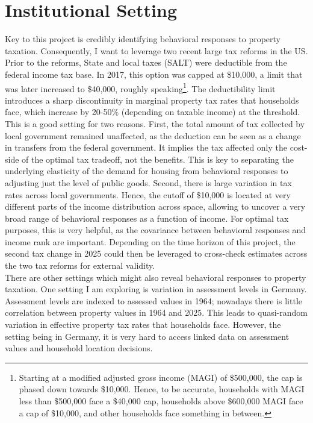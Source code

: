 \documentclass[fleqn,10pt]{olplainarticle}
\begin{document}
\section*{Institutional Setting}
Key to this project is credibly identifying behavioral responses to property taxation. Consequently, I want to leverage two recent large tax reforms in the US. Prior to the reforms, State and local taxes (SALT) were deductible from the federal income tax base. In 2017, this option was capped at \$10,000, a limit that was later increased to \$40,000, roughly speaking\footnote{Starting at a modified adjusted gross income (MAGI) of \$500,000, the cap is phased down towards \$10,000. Hence, to be accurate, households with MAGI less than \$500,000 face a \$40,000 cap, households above \$600,000 MAGI face a cap of \$10,000, and other households face something in between.}. The deductibility limit introduces a sharp discontinuity in marginal property tax rates that households face, which increase by 20-50\% (depending on taxable income) at the threshold. This is a good setting for two reasons. First, the total amount of tax collected by local government remained unaffected, as the deduction can be seen as a change in transfers from the federal government. It implies the tax affected only the cost-side of the optimal tax tradeoff, not the benefits. This is key to separating the underlying elasticity of the demand for housing from behavioral responses to adjusting just the level of public goods. Second, there is large variation in tax rates across local governments. Hence, the cutoff of \$10,000 is located at very different parts of the income distribution across space, allowing to uncover a very broad range of behavioral responses as a function of income. For optimal tax purposes, this is very helpful, as the covariance between behavioral responses and income rank are important. Depending on the time horizon of this project, the second tax change in 2025 could then be leveraged to cross-check estimates across the two tax reforms for external validity.\\
There are other settings which might also reveal behavioral responses to property taxation. One setting I am exploring is variation in assessment levels in Germany. Assessment levels are indexed to assessed values in 1964; nowadays there is little correlation between property values in 1964 and 2025. This leads to quasi-random variation in effective property tax rates that households face. However, the setting being in Germany, it is very hard to access linked data on assessment values and household location decisions.\\
\end{document}
